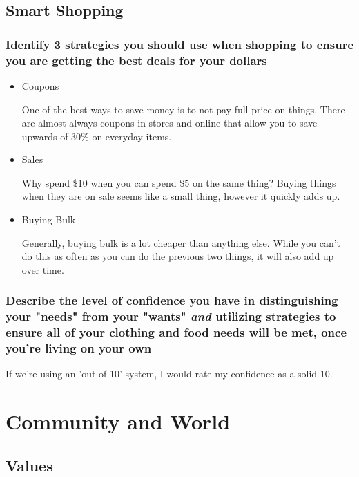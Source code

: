 \documentclass[11pt]{article}
\begin{document}
\subsection*{Smart Shopping}
\label{sec:orgce482b5}
\subsubsection*{Identify 3 strategies you should use when shopping to ensure you are getting the best deals for your dollars}
\label{sec:org3290d3a}
\begin{itemize}
\item Coupons
\label{sec:org24b12df}

One of the best ways to save money is to not pay full price on things. There are almost always coupons in stores and online that allow you to save upwards of 30\% on everyday items.

\item Sales
\label{sec:org3f51fff}

Why spend \$10 when you can spend \$5 on the same thing? Buying things when they are on sale seems like a small thing, however it quickly adds up. 

\item Buying Bulk
\label{sec:orgfc01a91}

Generally, buying bulk is a lot cheaper than anything else. While you can't do this as often as you can do the previous two things, it will also add up over time.
\end{itemize}

\subsubsection*{Describe the level of confidence you have in distinguishing your "needs" from your "wants" \emph{and} utilizing strategies to ensure all of your clothing and food needs will be met, once you're living on your own}
\label{sec:orge794b32}

If we're using an 'out of 10' system, I would rate my confidence as a solid 10. 

\section*{Community and World}
\label{sec:org01fe35b}
\subsection*{Values}
\label{sec:org1db1ce4}
\end{document}
